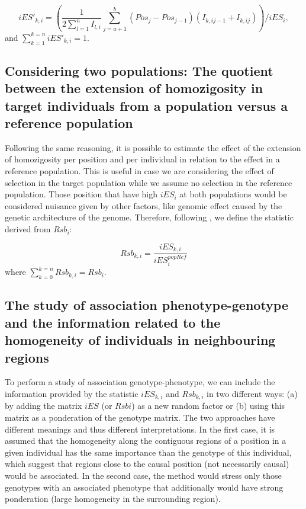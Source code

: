 \documentclass[a4paper,11pt]{article}
\begin{document}
\begin{equation}
 iES'_{k,i} = %
(\frac{1}{2\sum_{l=1}^{n}I_{l,i}} \sum_{j=a+1}^{b} (Pos_{j} - Pos_{j-1}) (I_{k,ij-1} + I_{k,ij}))/iES_i,
\end{equation}
and $\sum_{k=1}^{k=n}iES'_{k,i}=1$.

\subsection{Considering two populations: The quotient between the extension of homozigosity in target individuals from a population versus a reference population}
Following the same reasoning, it is possible to estimate the effect of the extension of homozigosity per position and per individual in relation to the effect in a reference population. This is useful in case we are considering the effect of selection in the target population while we assume no selection in the reference population. Those position that have high $iES_i$ at both populations would be considered nuisance given by other factors, like genomic effect caused by the genetic architecture of the genome. Therefore, following \citet{Tang:2007by}, we define the statistic derived from $Rsb_i$:

\begin{equation}
Rsb_{k,i} = \frac{iES_{k,i}}{iES_{i}^{popRef}}
\end{equation}
where $\sum_{k=0}^{k=n}Rsb_{k,i} = Rsb_i.$

\subsection{The study of association phenotype-genotype and the information related to the homogeneity of individuals in neighbouring regions}
To perform a study of association genotype-phenotype, we can include the information provided by the statistic $iES_{k,i}$ and $Rsb_{k,i}$ in two different ways: (a) by adding the matrix $iES$ (or $Rsbi$) as a new random factor or (b) using this matrix as a ponderation of the genotype matrix. The two approaches have different meanings and thus different interpretations. In the first case, it is assumed that the homogeneity along the contiguous regions of a position  in a given individual has the same importance than the genotype of this individual, which suggest that regions close to the causal position (not necessarily causal) would be associated. In the second case, the method would stress only those genotypes with an associated phenotype that additionally would have strong ponderation (large homogeneity in the surrounding region). 
\end{document}
